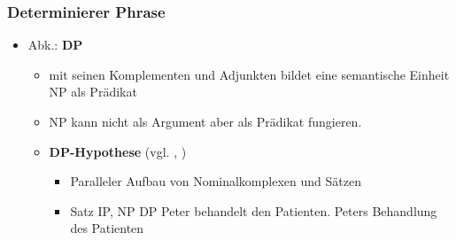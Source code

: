 \begin{frame}
\frametitle{Determinierer Phrase}

\begin{itemize}
	\item Abk.: \textbf{DP} 
	\begin{itemize}
		\item {} mit seinen Komplementen und Adjunkten bildet eine semantische Einheit \ras NP als Prädikat
		\item NP kann nicht als Argument aber als Prädikat fungieren.
		\eal 
		\zl
		
		
		\item \textbf{DP-Hypothese} (vgl. \citet{Abney87a}, \citet{Brame82a})
		\begin{itemize}
			\item Paralleler Aufbau von Nominalkomplexen und Sätzen
			\item Satz \ras IP, NP \ras DP
			\eal
			\ex Peter behandelt den Patienten.
			\ex Peters Behandlung des Patienten
			\zl
			
		\end{itemize}
					
	\end{itemize}
\end{itemize}

\end{frame}



